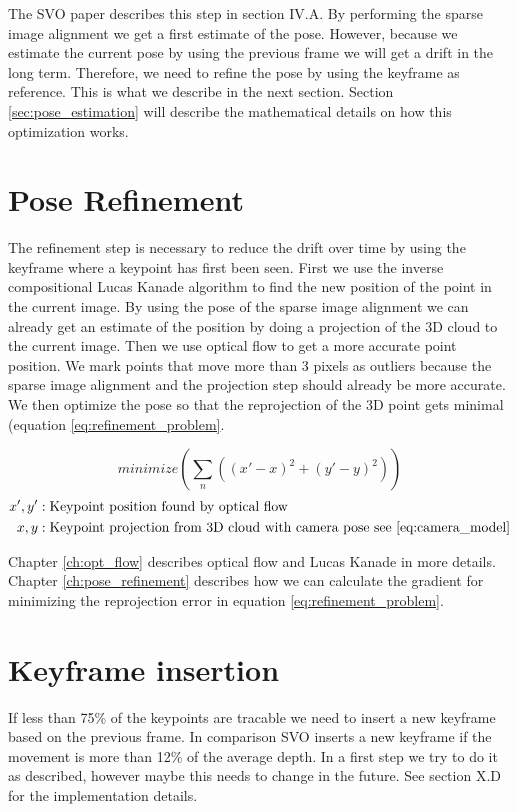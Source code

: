 \documentclass[11pt,a4paper,titlepage,oneside]{report}
\begin{document}
The SVO paper \cite{svo2} describes this step in section IV.A. By performing the sparse image alignment we get a first estimate of the pose. However, because we estimate the current pose by using the previous frame we will get a drift in the long term. Therefore, we need to refine the pose by using the keyframe as reference. This is what we describe in the next section. Section \ref{sec:pose_estimation} will describe the mathematical details on how this optimization works.

\section{Pose Refinement}\label{sec:refinement}

The refinement step is necessary to reduce the drift over time by using the keyframe where a keypoint has first been seen. First we use the inverse compositional Lucas Kanade algorithm to find the new position of the point in the current image. By using the pose of the sparse image alignment we can already get an estimate of the position by doing a projection of the 3D cloud to the current image. Then we use optical flow to get a more accurate point position. We mark points that move more than 3 pixels as outliers because the sparse image alignment and the projection step should already be more accurate. We then optimize the pose so that the reprojection of the 3D point gets minimal (equation \ref{eq:refinement_problem}.

\begin{equation}\label{eq:refinement_problem}
  minimize(\sum_n ((x'-x)^2+(y'-y)^2))
\end{equation}
\begin{align*}
  x',y'   &: \text{Keypoint position found by optical flow}\\
  x,y     &: \text{Keypoint projection from 3D cloud with camera pose see \ref{eq:camera_model}}
\end{align*}

Chapter \ref{ch:opt_flow} describes optical flow and Lucas Kanade in more details. Chapter \ref{ch:pose_refinement} describes how we can calculate the gradient for minimizing the reprojection error in equation \ref{eq:refinement_problem}.

\section{Keyframe insertion}
If less than 75\% of the keypoints are tracable we need to insert a new keyframe based on the previous frame. In comparison SVO inserts a new keyframe if the movement is more than 12\% of the average depth. In a first step we try to do it as described, however maybe this needs to change in the future. See \cite{svo2} section X.D for the implementation details.
\end{document}
